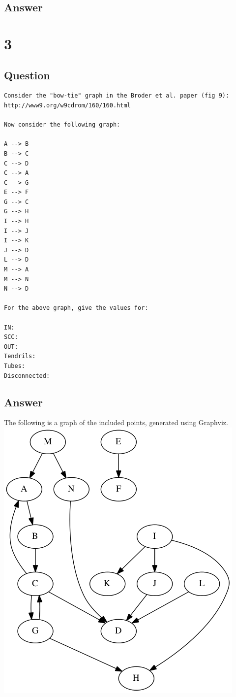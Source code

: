 \documentclass[letterpaper,11pt]{article}
\begin{document}
{\subsection*{Answer}



\newpage
\section*{3}

\subsection*{Question}

\begin{verbatim}
Consider the "bow-tie" graph in the Broder et al. paper (fig 9):
http://www9.org/w9cdrom/160/160.html

Now consider the following graph:

A --> B
B --> C
C --> D
C --> A
C --> G
E --> F
G --> C
G --> H
I --> H
I --> J
I --> K
J --> D 
L --> D
M --> A
M --> N
N --> D
    
For the above graph, give the values for:

IN: 
SCC: 
OUT: 
Tendrils: 
Tubes: 
Disconnected:
\end{verbatim}

\subsection*{Answer}
The following is a graph of the included points, generated using Graphviz.
\includegraphics[scale=0.5]{work/q3.png}

}
\end{document}
